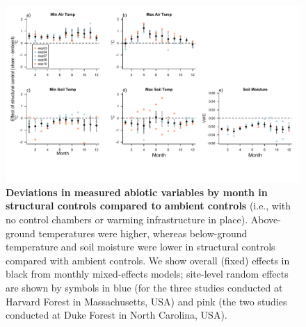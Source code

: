 \documentclass{article}
\begin{document}
 
 \begin{figure}[p]
\centering
 \includegraphics{../Analyses/figures/ShamVSAmbient_all.pdf}  
 \caption{\textbf{Deviations in measured abiotic variables by month in structural controls compared to ambient controls} (i.e., with no control chambers or warming infrastructure in place). Above-ground temperatures were higher, whereas below-ground temperature and soil moisture were lower in structural controls compared with ambient controls. We show overall (fixed) effects in black from monthly mixed-effects models; site-level random effects are shown by symbols in blue (for the three studies conducted at Harvard Forest in Massachusetts, USA) and pink (the two studies conducted at Duke Forest in North Carolina, USA).}
 \label{fig:shamamb}
 \end{figure}
\clearpage
\end{document}
